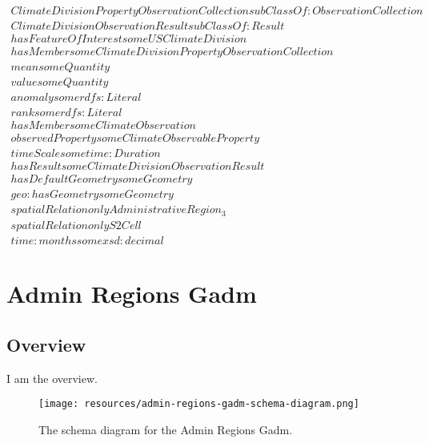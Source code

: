 \begin{align}
  ClimateDivisionPropertyObservationCollection subClassOf: ObservationCollection\\
  ClimateDivisionObservationResult subClassOf: Result\\
  hasFeatureOfInterest some USClimateDivision \\
  hasMember some ClimateDivisionPropertyObservationCollection \\
  mean some Quantity \\
  value some Quantity \\
  anomaly some rdfs:Literal \\
  rank some rdfs:Literal \\
  hasMember some ClimateObservation \\
  observedProperty some ClimateObservableProperty \\
  timeScale some time:Duration \\
  hasResult some ClimateDivisionObservationResult \\
  hasDefaultGeometry some Geometry \\
  geo:hasGeometry some Geometry \\
  spatialRelation only AdministrativeRegion_3 \\
  spatialRelation only S2Cell \\
  time:months some xsd:decimal \end{align}



\section{Admin Regions Gadm}
\label{sec:admin-regions-gadm}
\subsection{Overview}
\label{ssec:overview}

I am the overview.

\begin{figure}[h!]
  \begin{center}
    \texttt{[image: resources/admin-regions-gadm-schema-diagram.png]}
  \end{center}
  \caption{The schema diagram for the Admin Regions Gadm.}
  \label{fig:ov-diagram}
\end{figure}


